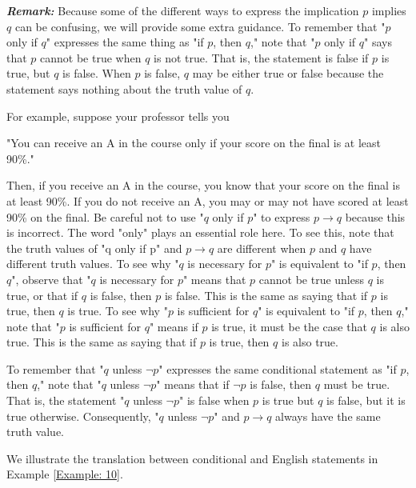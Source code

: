 \documentclass{Axon}
\begin{document}
\textbf{\textit{Remark:}} Because some of the different ways to express the implication \(p\) implies \(q\) can be confusing, we will provide some extra guidance. To remember that "\(p\) only if \(q\)" expresses the same thing as "if \(p\), then \(q\)," note that "\(p\) only if \(q\)" says that \(p\) cannot be true when \(q\) is not true. That is, the statement is false if \(p\) is true, but \(q\) is false. When \(p\) is false, \(q\) may be either true or false because the statement says nothing about the truth value of \(q\).

For example, suppose your professor tells you
\begin{center}
    "You can receive an A in the course only if your score on the final is at least 90\%."
\end{center}

Then, if you receive an A in the course, you know that your score on the final is at least 90\%. If you do not receive an A, you may or may not have scored at least 90\% on the final. Be careful not to use "\(q\) only if \(p\)" to express \(p \to q\) because this is incorrect. The word "only" plays an essential role here. To see this, note that the truth values of "q only if p" and \(p \to q\) are different when \(p\) and \(q\) have different truth values. To see why "\(q\) is necessary for \(p\)" is equivalent to "if \(p\), then \(q\)", observe that "\(q\) is necessary for \(p\)" means that \(p\) cannot be true unless \(q\) is true, or that if \(q\) is false, then \(p\) is false. This is the same as saying that if \(p\) is true, then \(q\) is true. To see why "\(p\) is sufficient for \(q\)" is equivalent to "if \(p\), then \(q\)," note that "\(p\) is sufficient for \(q\)" means if \(p\) is true, it must be the case that \(q\) is also true. This is the same as saying that if \(p\) is true, then \(q\) is also true.

To remember that "\(q\) unless \(\lnot p\)" expresses the same conditional statement as "if \(p\), then \(q\)," note that "\(q\) unless \(\lnot p\)" means that if \(\lnot p\) is false, then \(q\) must be true. That is, the statement "\(q\) unless \(\lnot p\)" is false when \(p\) is true but \(q\) is false, but it is true otherwise. Consequently, "\(q\) unless \(\lnot p\)" and \(p \to q\) always have the same truth value.

We illustrate the translation between conditional and English statements in Example \ref{Example: 10}.
\end{document}

